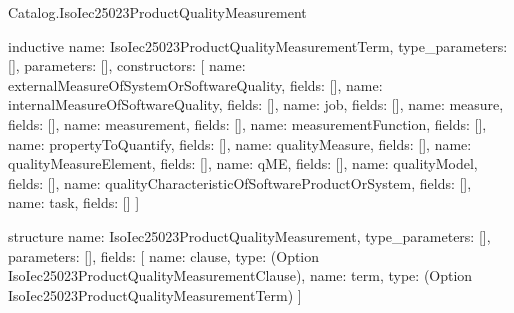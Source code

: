 \begin{lexlean}{Catalog.IsoIec25023ProductQualityMeasurement}
\begin{semanticmodule}
inductive{
  name: IsoIec25023ProductQualityMeasurementTerm,
  type_parameters: [],
  parameters: [],
  constructors: [
    {name: externalMeasureOfSystemOrSoftwareQuality, fields: []},
    {name: internalMeasureOfSoftwareQuality, fields: []},
    {name: job, fields: []},
    {name: measure, fields: []},
    {name: measurement, fields: []},
    {name: measurementFunction, fields: []},
    {name: propertyToQuantify, fields: []},
    {name: qualityMeasure, fields: []},
    {name: qualityMeasureElement, fields: []},
    {name: qME, fields: []},
    {name: qualityModel, fields: []},
    {name: qualityCharacteristicOfSoftwareProductOrSystem, fields: []},
    {name: task, fields: []}
  ]
}

structure{
  name: IsoIec25023ProductQualityMeasurement,
  type_parameters: [],
  parameters: [],
  fields: [
    {name: clause, type: (Option IsoIec25023ProductQualityMeasurementClause)},
    {name: term, type: (Option IsoIec25023ProductQualityMeasurementTerm)}
  ]
}
\end{semanticmodule}
\end{lexlean}
